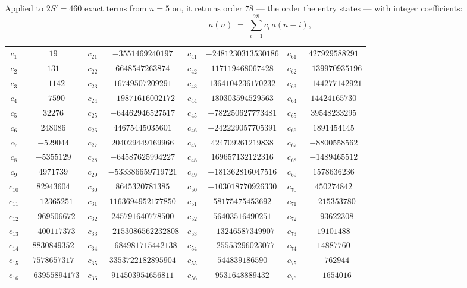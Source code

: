 \documentclass[11pt,a4paper]{article}
\theoremstyle{plain}
\theoremstyle{definition}
\begin{document}
Applied to $2S'=460$ exact terms from $n=5$ on, it returns order $78$ --- the
order the entry states --- with integer coefficients:
\[
a(n)\;=\;\sum_{i=1}^{78}c_i\,a(n-i),
\]
\begin{center}\small
\begin{tabular}{cccccccc}
$c_{1}$ & $19$ & $c_{21}$ & $-3551469240197$ & $c_{41}$ & $-2481230313530186$ & $c_{61}$ & $427929588291$ \\
$c_{2}$ & $131$ & $c_{22}$ & $6648547263874$ & $c_{42}$ & $117119468067428$ & $c_{62}$ & $-139970935196$ \\
$c_{3}$ & $-1142$ & $c_{23}$ & $16749507209291$ & $c_{43}$ & $1364104236170232$ & $c_{63}$ & $-144277142921$ \\
$c_{4}$ & $-7590$ & $c_{24}$ & $-19871616002172$ & $c_{44}$ & $180303594529563$ & $c_{64}$ & $14424165730$ \\
$c_{5}$ & $32276$ & $c_{25}$ & $-64462946527517$ & $c_{45}$ & $-782250627773481$ & $c_{65}$ & $39548233295$ \\
$c_{6}$ & $248086$ & $c_{26}$ & $44675445035601$ & $c_{46}$ & $-242229057705391$ & $c_{66}$ & $1891454145$ \\
$c_{7}$ & $-529044$ & $c_{27}$ & $204029449169966$ & $c_{47}$ & $424709261219838$ & $c_{67}$ & $-8800558562$ \\
$c_{8}$ & $-5355129$ & $c_{28}$ & $-64587625994227$ & $c_{48}$ & $169657132122316$ & $c_{68}$ & $-1489465512$ \\
$c_{9}$ & $4971739$ & $c_{29}$ & $-533386659719721$ & $c_{49}$ & $-181362816047516$ & $c_{69}$ & $1578636236$ \\
$c_{10}$ & $82943604$ & $c_{30}$ & $8645320781385$ & $c_{50}$ & $-103018770926330$ & $c_{70}$ & $450274842$ \\
$c_{11}$ & $-12365251$ & $c_{31}$ & $1163694952177850$ & $c_{51}$ & $58175475453692$ & $c_{71}$ & $-215353780$ \\
$c_{12}$ & $-969506672$ & $c_{32}$ & $245791640778500$ & $c_{52}$ & $56403516490251$ & $c_{72}$ & $-93622308$ \\
$c_{13}$ & $-400117373$ & $c_{33}$ & $-2153086562232808$ & $c_{53}$ & $-13246587349907$ & $c_{73}$ & $19101488$ \\
$c_{14}$ & $8830849352$ & $c_{34}$ & $-684981715442138$ & $c_{54}$ & $-25553296023077$ & $c_{74}$ & $14887760$ \\
$c_{15}$ & $7578657317$ & $c_{35}$ & $3353722182895904$ & $c_{55}$ & $544839186590$ & $c_{75}$ & $-762944$ \\
$c_{16}$ & $-63955894173$ & $c_{36}$ & $914503954656811$ & $c_{56}$ & $9531648889432$ & $c_{76}$ & $-1654016$ \\

\end{tabular}
\end{center}
\end{document}
